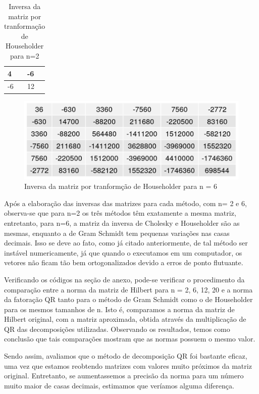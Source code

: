 \documentclass[12pt, a4paper]{article}
\begin{document}
\begin{table}[!htbp]
\caption{Inversa da matriz por tranformação de Householder para n=2}
\centering
\begin{tabular}{|l|l|}
\hline
4 & -6  \\
\hline
-6 & 12\\
\hline
\end{tabular}
\end{table}


\begin{figure}[!htbp]
    \centering
    \includegraphics[]{matrizes/matriz_HINVERSA_HH6.png}
    \caption{Inversa da matriz por tranformção de Householder para n = 6}
    \label{fig:my_label}
\end{figure}

\newpage

Após a elaboração das inversas das matrizes para cada método, com n= 2 e 6, observa-se que para n=2 os três métodos têm exatamente a mesma matriz, entretanto, para n=6, a matriz da inversa de Cholesky e Householder são as mesmas, enquanto a de Gram Schmidt tem pequenas variações nas casas decimais. Isso se deve ao fato, como já citado anteriormente, de tal método ser instável numericamente, já que quando o executamos em um computador, os vetores não ficam tão bem ortogonalizados devido a erros de ponto flutuante.


Verificando os códigos na seção de anexo, pode-se verificar o procedimento da comparação entre a norma da matriz de Hilbert para n = 2, 6, 12, 20 e a norma da fatoração QR tanto para o método de Gram Schmidt como o de Householder para os mesmos tamanhos de n.  Isto é, comparamos a norma da matriz de Hilbert original, com a matriz aproximada, obtida através da multiplicação de QR das decomposições utilizadas. Observando os resultados, temos como conclusão que tais comparações mostram que as normas possuem o mesmo valor. 

Sendo assim, avaliamos que o método de decomposição QR foi bastante eficaz, uma vez que estamos reobtendo matrizes com valores muito próximos da matriz original.
Entretanto, se aumentassemos a precisão da norma para um número muito maior de casas decimais, estimamos que veríamos alguma diferença. 
\end{document}
